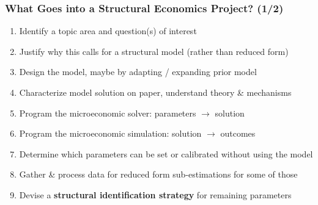 \documentclass[aspectratio=169]{beamer}
\begin{document}

\begin{frame}
\frametitle{What Goes into a Structural Economics Project? (1/2)}
\begin{enumerate}
	\item Identify a topic area and question(s) of interest
	
	\item Justify why this calls for a structural model (rather than reduced form)
	
	\item <2->Design the model, maybe by adapting / expanding prior model
	
	\item <2->Characterize model solution on paper, understand theory \& mechanisms
	
	\item <3->Program the microeconomic solver: parameters $\longrightarrow$ solution
	
	\item <3->Program the microeconomic simulation: solution $\longrightarrow$ outcomes
	
	\item <4->Determine which parameters can be set or calibrated without using the model
	
	\item <4->Gather \& process data for reduced form sub-estimations for some of those
	
	\item <5->Devise a \textbf{structural identification strategy} for remaining parameters
\end{enumerate}
\end{frame}
\end{document}
